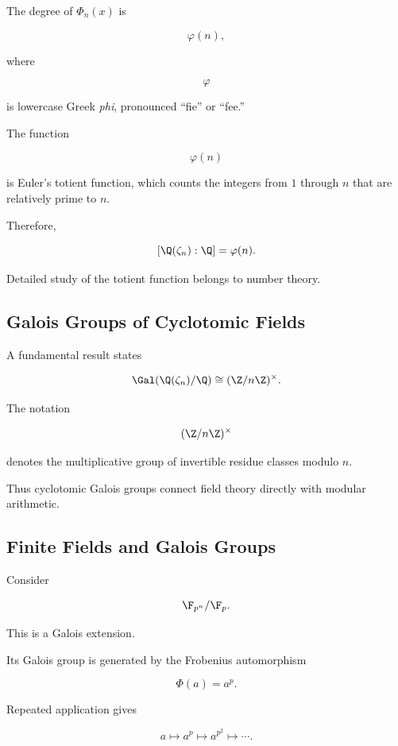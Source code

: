 The degree of \(\Phi_n(x)\) is

\[ \varphi(n), \]

where

\[ \varphi \]

is lowercase Greek \emph{phi}, pronounced ``fie'' or ``fee.''

The function

\[ \varphi(n) \]

is Euler's totient function, which counts the integers from \(1\) through
\(n\) that are relatively prime to \(n\).

Therefore,

\[ [\Q(\zeta_n):\Q]=\varphi(n). \]

Detailed study of the totient function belongs to number theory.

\subsection{Galois Groups of Cyclotomic Fields}
\label{subsec:galois-cyclotomic-fields}

A fundamental result states

\[ \Gal(\Q(\zeta_n)/\Q)\cong(\Z/n\Z)^\times. \]

The notation

\[ (\Z/n\Z)^\times \]

denotes the multiplicative group of invertible residue classes modulo \(n\).

Thus cyclotomic Galois groups connect field theory directly with modular
arithmetic.

\subsection{Finite Fields and Galois Groups}
\label{subsec:galois-finite-fields}

Consider

\[ \F_{p^n}/\F_p. \]

This is a Galois extension.

Its Galois group is generated by the Frobenius automorphism

\[ \Phi(a)=a^p. \]

Repeated application gives

\[ a\mapsto a^p\mapsto a^{p^2}\mapsto\cdots. \]

